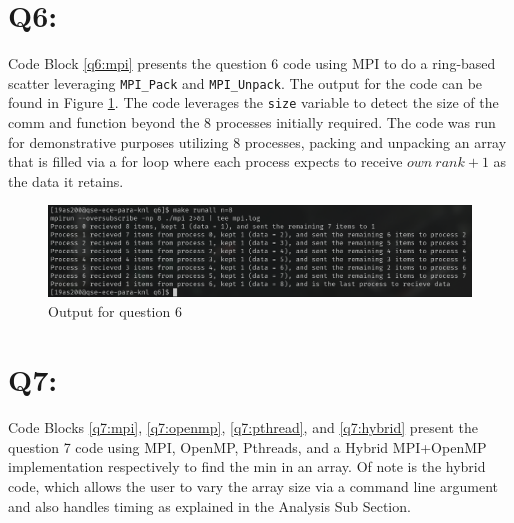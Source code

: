 \documentclass[11pt]{article}
\begin{document}
\newpage

\section*{Q6:}

Code Block \ref{q6:mpi} presents the question 6 code using MPI to do a ring-based scatter leveraging \texttt{MPI\_Pack} and \texttt{MPI\_Unpack}.
The output for the code can be found in Figure \ref{fig:q6}.
The code leverages the \texttt{size} variable to detect the size of the comm and function beyond the 8 processes initially required.
The code was run for demonstrative purposes utilizing 8 processes, packing and unpacking an array that is filled via a for loop where each process expects to receive $own\ rank + 1$ as the data it retains.



\begin{figure}[H]
\centering
    \includegraphics[width=\textwidth]{./images/q6.png}
\caption{Output for question 6}
\label{fig:q6}
\end{figure}

\newpage
\section*{Q7:}

Code Blocks \ref{q7:mpi}, \ref{q7:openmp}, \ref{q7:pthread}, and \ref{q7:hybrid} present the question 7 code using MPI, OpenMP, Pthreads, and a Hybrid MPI+OpenMP implementation respectively to find the min in an array.
Of note is the hybrid code, which allows the user to vary the array size via a command line argument and also handles timing as explained in the Analysis Sub Section.





\end{document}
